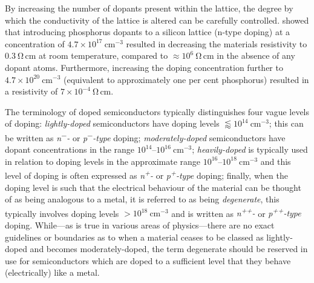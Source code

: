 By increasing the number of dopants present within the lattice, the degree by which the conductivity of the lattice is altered can be carefully controlled. \textcite{Pearson1949} showed that introducing phosphorus dopants to a silicon lattice (n-type doping) at a concentration of $4.7 \times 10^{17}~\mathrm{cm^{-3}}$ resulted in decreasing the materials resistivity to $0.3~\mathrm{\Omega\,cm}$ at room temperature, compared to $\approx 10^{6}~\mathrm{\Omega\,cm}$ in the absence of any dopant atoms. Furthermore, increasing the doping concentration further to $4.7 \times 10^{20}~\mathrm{cm^{-3}}$ (equivalent to approximately one per cent phosphorus) resulted in a resistivity of $7 \times 10^{-4}~\mathrm{\Omega\,cm}$.
\par 
The terminology of doped semiconductors typically distinguishes four vague levels of doping: \textit{lightly-doped} semiconductors have doping levels  $\lessapprox 10^{14}~\mathrm{cm^{-3}}$; this can be written as \textit{n\textsuperscript{$-$}-} or \textit{p\textsuperscript{$-$}-type} doping; \textit{moderately-doped} semiconductors have dopant concentrations in the range $10^{14}\mbox{--}10^{16}~\mathrm{cm^{-3}}$; \textit{heavily-doped} is typically used in relation to doping levels in the approximate range $10^{16}\mbox{--}10^{18}~\mathrm{cm^{-3}}$ and this level of doping is often expressed as \textit{n\textsuperscript{+}-} or \textit{p\textsuperscript{+}-type} doping; finally, when the doping level is such that the electrical behaviour of the material can be thought of as being analogous to a metal, it is referred to as being \textit{degenerate}, this typically involves doping levels $> 10^{18}~\mathrm{cm^{-3}}$ and is written as \textit{n\textsuperscript{++}-} or \textit{p\textsuperscript{++}-type} doping. While---as is true in various areas of physics---there are no exact guidelines or boundaries as to when a material ceases to be classed as lightly-doped and becomes moderately-doped, the term degenerate should be reserved in use for semiconductors which are doped to a sufficient level that they behave (electrically) like a metal.
%
